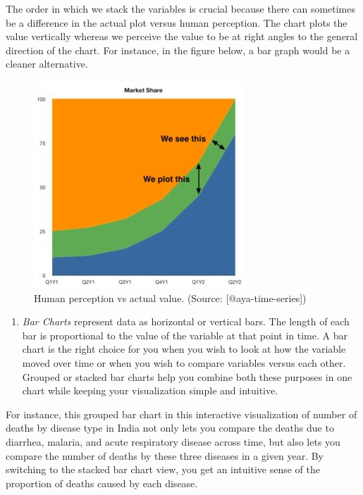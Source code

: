 \documentclass[]{book}
\providecommand{\tightlist}{%
  \setlength{\itemsep}{0pt}\setlength{\parskip}{0pt}}
\theoremstyle{definition}
\theoremstyle{definition}
\theoremstyle{definition}
\theoremstyle{remark}
\begin{document}
The order in which we stack the variables is crucial because there can
sometimes be a difference in the actual plot versus human perception.
The chart plots the value vertically whereas we perceive the value to be
at right angles to the general direction of the chart. For instance, in
the figure below, a bar graph would be a cleaner alternative.

\begin{figure}

{\centering \includegraphics[width=0.3\linewidth]{images/aya-stacked-perception} 

}

\caption{Human perception vs actual value. (Source: [@aya-time-series])}\label{fig:aya-stacked-perception}
\end{figure}

\begin{enumerate}
\def\labelenumi{\arabic{enumi}.}
\setcounter{enumi}{2}
\tightlist
\item
  \emph{Bar Charts} represent data as horizontal or vertical bars. The
  length of each bar is proportional to the value of the variable at
  that point in time. A bar chart is the right choice for you when you
  wish to look at how the variable moved over time or when you wish to
  compare variables versus each other. Grouped or stacked bar charts
  help you combine both these purposes in one chart while keeping your
  visualization simple and intuitive.
\end{enumerate}

For instance, this grouped bar chart in this interactive visualization
of number of deaths by disease type in India not only lets you compare
the deaths due to diarrhea, malaria, and acute respiratory disease
across time, but also lets you compare the number of deaths by these
three diseases in a given year. By switching to the stacked bar chart
view, you get an intuitive sense of the proportion of deaths caused by
each disease.
\end{document}
